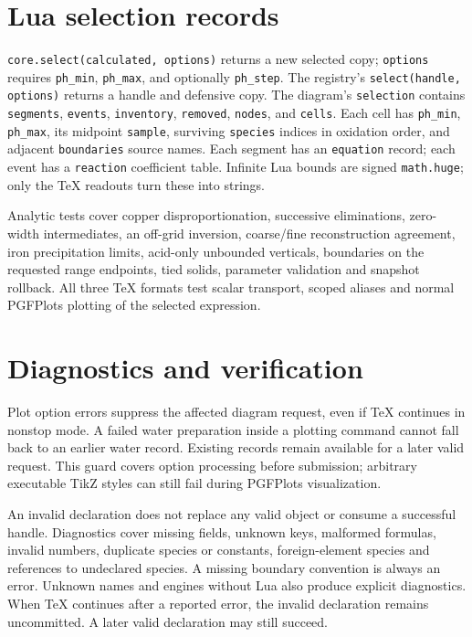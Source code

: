 \documentclass[a4paper,11pt]{ltxdoc}
\begin{document}
\section{Lua selection records}
\texttt{core.select(calculated, options)} returns a new selected copy;
\texttt{options} requires \texttt{ph\_min}, \texttt{ph\_max}, and optionally
\texttt{ph\_step}. The registry's \texttt{select(handle, options)} returns a handle
and defensive copy. The diagram's \texttt{selection} contains \texttt{segments},
\texttt{events}, \texttt{inventory}, \texttt{removed}, \texttt{nodes}, and
\texttt{cells}. Each cell has \texttt{ph\_min}, \texttt{ph\_max}, its midpoint
\texttt{sample}, surviving \texttt{species} indices in oxidation order, and
adjacent \texttt{boundaries} source names. Each segment has an \texttt{equation}
record; each event has a \texttt{reaction} coefficient table. Infinite Lua bounds
are signed \texttt{math.huge}; only the TeX readouts turn these into strings.

Analytic tests cover copper disproportionation, successive eliminations,
zero-width intermediates, an off-grid inversion, coarse/fine reconstruction
agreement, iron precipitation limits, acid-only unbounded verticals, boundaries
on the requested range endpoints, tied solids, parameter validation and snapshot
rollback. All three TeX formats test scalar transport, scoped aliases and normal
PGFPlots plotting of the selected expression.

\section{Diagnostics and verification}
Plot option errors suppress the affected diagram request, even if TeX continues
in nonstop mode. A failed water preparation inside a plotting command cannot
fall back to an earlier water record. Existing records remain available for a
later valid request. This guard covers option processing before submission;
arbitrary executable TikZ styles can still fail during PGFPlots visualization.

An invalid declaration does not replace any valid object or consume a successful
handle. Diagnostics cover missing fields, unknown keys, malformed formulas,
invalid numbers, duplicate species or constants, foreign-element species and
references to undeclared species. A missing boundary convention is always an
error. Unknown names and engines without Lua also produce explicit diagnostics.
When TeX continues after a reported error, the invalid declaration remains
uncommitted. A later valid declaration may still succeed.
\end{document}
